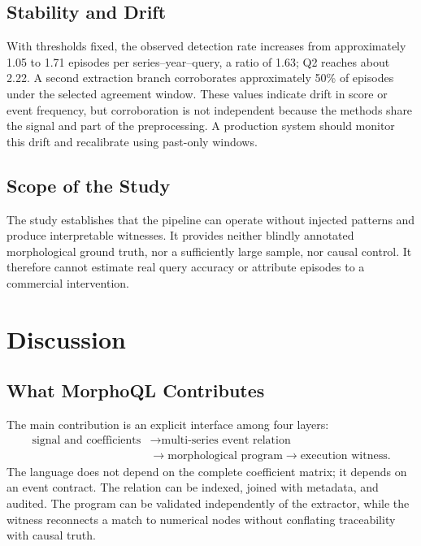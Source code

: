 \documentclass[11pt,a4paper]{article}
\begin{document}
\subsection{Stability and Drift}

With thresholds fixed, the observed detection rate increases from approximately 1.05 to 1.71 episodes per series--year--query, a ratio of 1.63; Q2 reaches about 2.22. A second extraction branch corroborates approximately 50\% of episodes under the selected agreement window. These values indicate drift in score or event frequency, but corroboration is not independent because the methods share the signal and part of the preprocessing. A production system should monitor this drift and recalibrate using past-only windows.

\subsection{Scope of the Study}

The study establishes that the pipeline can operate without injected patterns and produce interpretable witnesses. It provides neither blindly annotated morphological ground truth, nor a sufficiently large sample, nor causal control. It therefore cannot estimate real query accuracy or attribute episodes to a commercial intervention.

\section{Discussion}

\subsection{What MorphoQL Contributes}

The main contribution is an explicit interface among four layers:
\begin{equation}
\begin{aligned}
 \text{signal and coefficients}
 &\longrightarrow \text{multi-series event relation}\\
 &\longrightarrow \text{morphological program}
 \longrightarrow \text{execution witness}.
\end{aligned}
\end{equation}
The language does not depend on the complete coefficient matrix; it depends on an event contract. The relation can be indexed, joined with metadata, and audited. The program can be validated independently of the extractor, while the witness reconnects a match to numerical nodes without conflating traceability with causal truth.
\end{document}
